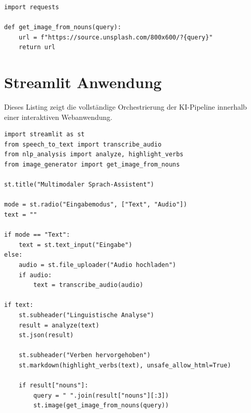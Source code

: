 \begin{lstlisting}[caption={image_generator.py – Generierung semantischer Bildabfragen}]
import requests

def get_image_from_nouns(query):
    url = f"https://source.unsplash.com/800x600/?{query}"
    return url
\end{lstlisting}

\section{Streamlit Anwendung}

Dieses Listing zeigt die vollständige Orchestrierung der KI-Pipeline innerhalb einer interaktiven Webanwendung.

\begin{lstlisting}[caption={app.py – Gesamtpipeline des multimodalen Systems}]
import streamlit as st
from speech_to_text import transcribe_audio
from nlp_analysis import analyze, highlight_verbs
from image_generator import get_image_from_nouns

st.title("Multimodaler Sprach-Assistent")

mode = st.radio("Eingabemodus", ["Text", "Audio"])
text = ""

if mode == "Text":
    text = st.text_input("Eingabe")
else:
    audio = st.file_uploader("Audio hochladen")
    if audio:
        text = transcribe_audio(audio)

if text:
    st.subheader("Linguistische Analyse")
    result = analyze(text)
    st.json(result)

    st.subheader("Verben hervorgehoben")
    st.markdown(highlight_verbs(text), unsafe_allow_html=True)

    if result["nouns"]:
        query = " ".join(result["nouns"][:3])
        st.image(get_image_from_nouns(query))
\end{lstlisting}